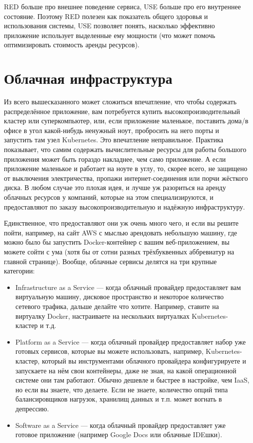 \documentclass[a5paper]{article}
\begin{document}
RED больше про внешнее поведение сервиса, USE больше про его внутреннее состояние. Поэтому RED полезен как показатель общего здоровья и использования системы, USE позволяет понять, насколько эффективно приложение использует выделенные ему мощности (что может помочь оптимизировать стоимость аренды ресурсов).

\section{Облачная инфраструктура}

Из всего вышесказанного может сложиться впечатление, что чтобы содержать распределённое приложение, вам потребуется купить высокопроизводительный кластер или суперкомпьютер, или, если приложение маленькое, поставить дома/в офисе в угол какой-нибудь ненужный ноут, пробросить на него порты и запустить там узел Kubernetes. Это впечатление неправильное. Практика показывает, что самим содержать вычислительные ресурсы для работы большого приложения может быть гораздо накладнее, чем само приложение. А если приложение маленькое и работает на ноуте в углу, то, скорее всего, не защищено от выключения электричества, пропажи интернет-соединения или порчи жёсткого диска. В любом случае это плохая идея, и лучше уж разориться на аренду облачных ресурсов у компаний, которые на этом специализируются, и предоставляют по заказу высокопроизводительную и надёжную инфраструктуру.

Единственное, что предоставляют они уж очень много чего, и если вы решите пойти, например, на сайт AWS с мыслью арендовать небольшую машину, где можно было бы запустить Docker-контейнер с вашим веб-приложением, вы можете сойти с ума (хотя бы от сотни разных трёхбуквенных аббревиатур на главной странице). Вообще, облачные сервисы делятся на три крупные категории:

\begin{itemize}
    \item Infrastructure as a Service --- когда облачный провайдер предоставляет вам виртуальную машину, дисковое пространство и некоторое количество сетевого трафика, дальше делайте что хотите. Например, ставите на виртуалку Docker, настраиваете на нескольких виртуалках Kubernetes-кластер и т.д.
    \item Platform as a Service --- когда облачный провайдер предоставляет набор уже готовых сервисов, которые вы можете использовать, например, Kubernetes-кластер, который вы инструментами облачного провайдера конфигурируете и запускаете на нём свои контейнеры, даже не зная, на какой операционной системе они там работают. Обычно дешевле и быстрее в настройке, чем IaaS, но если вы знаете, что делаете. Если не знаете, количество опций типа балансировщиков нагрузок, хранилищ данных и т.п. может вогнать в депрессию.
    \item Software as a Service --- когда облачный провайдер предоставляет уже готовое приложение (например Google Docs или облачные IDEшки).
\end{itemize}
\end{document}
